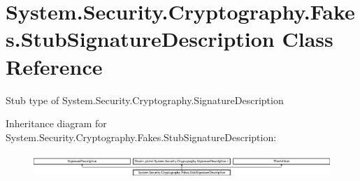 \hypertarget{class_system_1_1_security_1_1_cryptography_1_1_fakes_1_1_stub_signature_description}{\section{System.\-Security.\-Cryptography.\-Fakes.\-Stub\-Signature\-Description Class Reference}
\label{class_system_1_1_security_1_1_cryptography_1_1_fakes_1_1_stub_signature_description}
}


Stub type of System.\-Security.\-Cryptography.\-Signature\-Description 


Inheritance diagram for System.\-Security.\-Cryptography.\-Fakes.\-Stub\-Signature\-Description\-:\begin{figure}[H]
\begin{center}
\leavevmode
\includegraphics[height=0.921811cm]{class_system_1_1_security_1_1_cryptography_1_1_fakes_1_1_stub_signature_description}
\end{center}
\end{figure}
